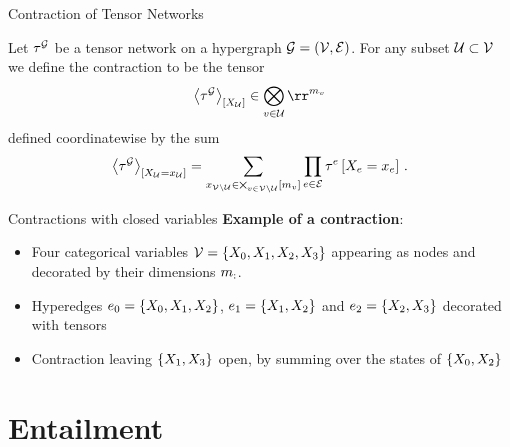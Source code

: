 \documentclass{beamer}
\begin{document}
    \begin{frame}{Contraction of Tensor Networks}
        \begin{definition}[Contraction]
            Let $\tau^{\mathcal{G}}$ be a tensor network on a hypergraph $\mathcal{G}=(\mathcal{V},\mathcal{E})$.
            For any subset $\mathcal{U}\subset\mathcal{V}$ we define the contraction to be the tensor
            \begin{align*}
                \contractionof{\tnetof{\graph}}{\catvariableof{\secnodes}} \in \bigotimes_{\node\in\secnodes} \rr^{\catdimof{\node}}
            \end{align*}
            defined coordinatewise by the sum
            \begin{align*}
                \left\langle \tau^{\mathcal{G}}\right\rangle_{\left[ X_{\mathcal{U}}=x_{\mathcal{U}} \right]} =
                \sum_{x_{\mathcal{V}\backslash\mathcal{U}}\in\bigtimes_{v\in\mathcal{V}\backslash\mathcal{U}}[m_{v}]}
                \prod_{e\in\mathcal{E}}\tau^{e}\left[X_{e}=x_{e}\right] \, .
            \end{align*}
        \end{definition}
    \end{frame}

    \begin{frame}{Contractions with closed variables}
        \textbf{Example of a contraction}:
        \begin{itemize}
            \item Four categorical variables $\mathcal{V} = \{X_{0},X_{1},X_{2},X_{3}\}$ appearing as nodes and decorated by their dimensions $m_{:}$.
            \item Hyperedges  $e_0=\{X_{0},X_{1},X_{2}\}$, $e_1=\{X_{1},X_{2}\}$ and $e_2=\{X_{2},X_{3}\}$ decorated with tensors
            \item Contraction leaving $\{X_{1},X_{3}\}$ open, by summing over the states of $\{X_{0},X_{2}\}$
        \end{itemize}

        \begin{center}
            
        \end{center}
    \end{frame}


    \section{Entailment}
\end{document}
